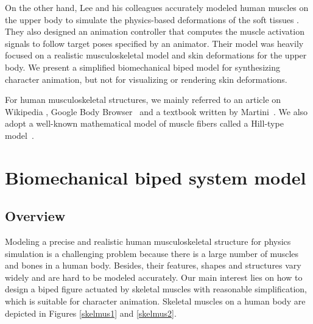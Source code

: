 \documentclass[master,english,final]{kaist-ucs}
\begin{document}
On the other hand, Lee and his colleagues accurately modeled human muscles on the upper body
to simulate the physics-based deformations of the soft tissues \cite{Lee:2009:CBM:1559755.1559756}.
They also designed an animation controller that computes the muscle activation signals to follow target poses
specified by an animator. Their model was heavily focused on a realistic musculoskeletal
model and skin deformations for the upper body.
We present a simplified biomechanical biped model for synthesizing character animation,
but not for visualizing or rendering skin deformations.

For human musculoskeletal structures, we mainly referred to an article on Wikipedia \cite{Wikipedia},
Google Body Browser~\cite{bodybrowser} and a textbook written by Martini~\cite{martini}.
We also adopt a well-known mathematical model of muscle fibers
called a Hill-type model~\cite{hill, Lee:2006:HUB:1141911.1142013}.





\chapter{Biomechanical biped system model}

\section{Overview}

Modeling a precise and realistic human musculoskeletal structure for physics simulation
is a challenging problem because there is a large number of muscles and bones in a human body.
Besides, their features, shapes and structures vary widely and are hard to be modeled
accurately.
Our main interest lies on how to design a biped figure actuated by skeletal muscles with reasonable
simplification, which is suitable for character animation.
Skeletal muscles on a human body are depicted in Figures \ref{skelmus1} and \ref{skelmus2}.
\end{document}
